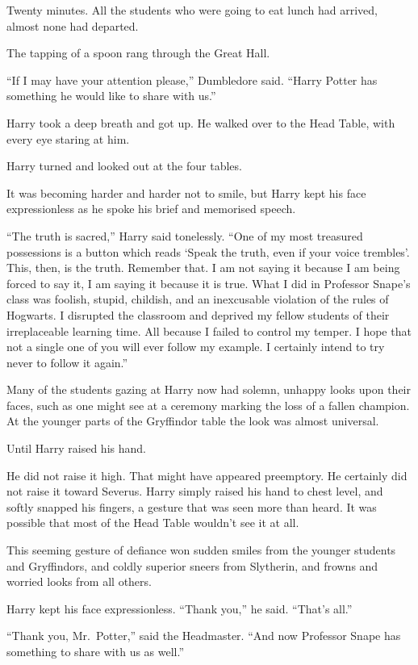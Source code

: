 Twenty minutes. All the students who were going to eat lunch had
arrived, almost none had departed.

The tapping of a spoon rang through the Great Hall.

``If I may have your attention please,'' Dumbledore said. ``Harry Potter
has something he would like to share with us.''

Harry took a deep breath and got up. He walked over to the Head Table,
with every eye staring at him.

Harry turned and looked out at the four tables.

It was becoming harder and harder not to smile, but Harry kept his face
expressionless as he spoke his brief and memorised speech.

``The truth is sacred,'' Harry said tonelessly. ``One of my most
treasured possessions is a button which reads `Speak the truth, even if
your voice trembles'. This, then, is the truth. Remember that. I am not
saying it because I am being forced to say it, I am saying it because it
is true. What I did in Professor Snape's class was foolish, stupid,
childish, and an inexcusable violation of the rules of Hogwarts. I
disrupted the classroom and deprived my fellow students of their
irreplaceable learning time. All because I failed to control my temper.
I hope that not a single one of you will ever follow my example. I
certainly intend to try never to follow it again.''

Many of the students gazing at Harry now had solemn, unhappy looks upon
their faces, such as one might see at a ceremony marking the loss of a
fallen champion. At the younger parts of the Gryffindor table the look
was almost universal.

Until Harry raised his hand.

He did not raise it high. That might have appeared preemptory. He
certainly did not raise it toward Severus. Harry simply raised his hand
to chest level, and softly snapped his fingers, a gesture that was seen
more than heard. It was possible that most of the Head Table wouldn't
see it at all.

This seeming gesture of defiance won sudden smiles from the younger
students and Gryffindors, and coldly superior sneers from Slytherin, and
frowns and worried looks from all others.

Harry kept his face expressionless. ``Thank you,'' he said. ``That's
all.''

``Thank you, Mr.~Potter,'' said the Headmaster. ``And now Professor
Snape has something to share with us as well.''

